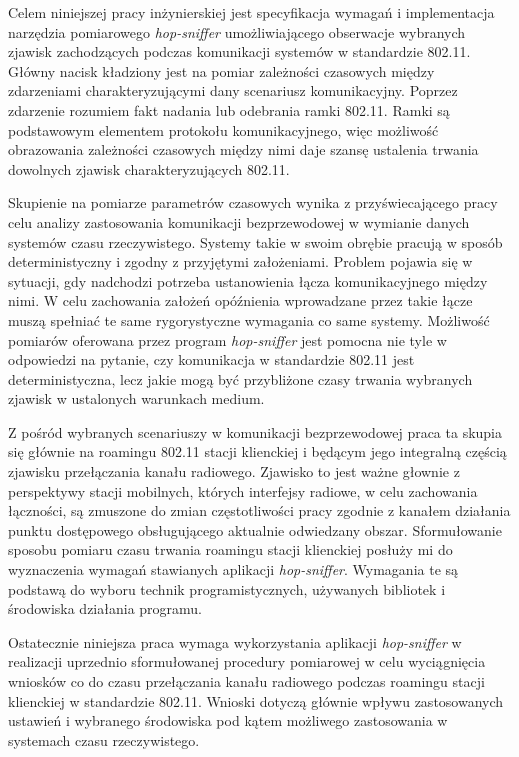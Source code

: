 
Celem niniejszej pracy inżynierskiej jest specyfikacja wymagań i implementacja narzędzia pomiarowego \emph{hop-sniffer} umożliwiającego obserwacje wybranych zjawisk zachodzących podczas komunikacji systemów w standardzie 802.11. Główny nacisk kładziony jest na pomiar zależności czasowych między zdarzeniami charakteryzującymi dany scenariusz komunikacyjny. Poprzez zdarzenie rozumiem fakt nadania lub odebrania ramki 802.11. Ramki są podstawowym elementem protokołu komunikacyjnego, więc możliwość obrazowania zależności czasowych między nimi daje szansę  ustalenia trwania dowolnych zjawisk charakteryzujących 802.11.

Skupienie na pomiarze parametrów czasowych wynika z przyświecającego pracy celu analizy zastosowania komunikacji bezprzewodowej w wymianie danych systemów czasu rzeczywistego. Systemy takie w swoim obrębie pracują w sposób deterministyczny i zgodny z przyjętymi założeniami. Problem pojawia się w sytuacji, gdy nadchodzi potrzeba ustanowienia łącza komunikacyjnego między nimi. W celu zachowania założeń opóźnienia wprowadzane przez takie łącze muszą spełniać te same rygorystyczne wymagania co same systemy. Możliwość pomiarów oferowana przez program \emph{hop-sniffer} jest pomocna nie tyle w odpowiedzi na pytanie, czy komunikacja w standardzie 802.11 jest deterministyczna, lecz jakie mogą być przybliżone czasy trwania wybranych zjawisk w ustalonych warunkach medium. 

Z pośród wybranych scenariuszy w komunikacji bezprzewodowej praca ta skupia się głównie na roamingu 802.11 stacji klienckiej i będącym jego integralną częścią zjawisku przełączania kanału radiowego. Zjawisko to jest ważne głownie z perspektywy stacji mobilnych, których interfejsy radiowe, w celu zachowania łączności, są zmuszone do zmian częstotliwości pracy zgodnie z kanałem działania punktu dostępowego obsługującego aktualnie odwiedzany obszar. Sformułowanie sposobu pomiaru czasu trwania roamingu stacji klienckiej posłuży mi do wyznaczenia wymagań stawianych aplikacji \emph{hop-sniffer}. Wymagania te są podstawą do wyboru technik programistycznych, używanych bibliotek i środowiska działania programu.

Ostatecznie niniejsza praca wymaga wykorzystania aplikacji \emph{hop-sniffer} w realizacji uprzednio sformułowanej procedury pomiarowej w celu wyciągnięcia wniosków co do czasu przełączania kanału radiowego podczas roamingu stacji klienckiej w standardzie 802.11. Wnioski dotyczą głównie wpływu zastosowanych ustawień i wybranego środowiska pod kątem możliwego zastosowania w systemach czasu rzeczywistego.
